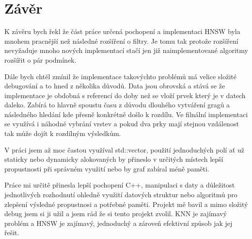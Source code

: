 \documentclass[czech,semestral,dept460,male,csharp,cpdeclaration]{diploma}
\begin{document}
	\chapter{Závěr}
	
		K závěru bych řekl že část práce určená pochopení a implementaci HNSW byla mnohem pracnější než následné rozšíření o filtry. Je tomu tak protože rozšíření nevyžaduje mnoho nových implementací stačí jen již naimplementované algoritmy rozšířit o pár podmínek.
		
		Dále bych chtěl zmínil že implementace takovýchto problémů má velice složité debugování a to hned z několika důvodů. Data jsou obrovská a stává se že implementace je obdobná s referencí do doby než se vloží prvek který je v datech daleko. Zabírá to hlavně spoustu času z důvodu dlouhého vytváření gragů a následného hledání kde přesně konkrétně došlo k rozdílu. Ve filnální implementaci se využívá i náhodné vybrání vrstev a pokud dva prky mají stejnou vzdálenost tak může dojít k rozdílným výsledkům. 
		
		V práci jsem až moc častou využíval std::vector, použití jednoduchých polí ať už staticky nebo dynamicky alokovaných by přineslo v určitých místech lepší propustnosti při správném využití nebo by graf zabíral méně paměti.
		
		Práce mi určitě přinesla lepší pochopení C++, manipulaci s daty a důležitost jednotlivých rozhodnutí ohledně využití datových struktur nebo algoritmů pro zlepšení výsledné propustnosi a potřebné paměti. Projekt mě bavil a mimo složitý debug jsem si ji užil a jsem rád že si tento projekt zvolil. KNN je zajímavý problém a HNSW je zajímavý, jednoduchý a zároveň efektivní způsob jak jej řešit.
	
	\nocite{*}
	
	\printbibliography[title={Literatura}, heading=bibintoc]
	
\end{document}
